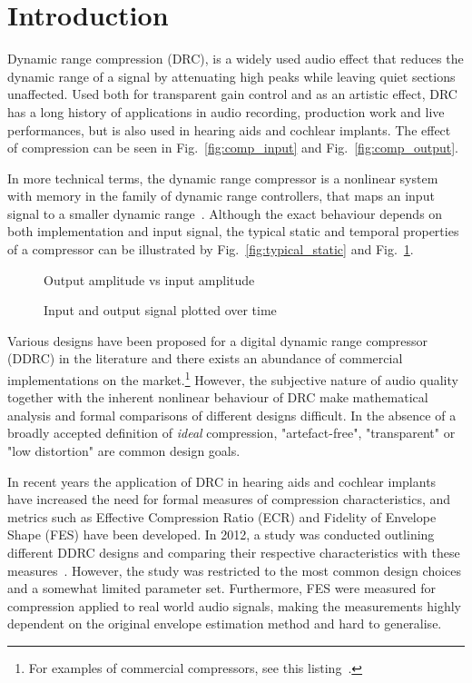 \documentclass[../main2.tex]{subfiles}
\providecommand{\rootdir}{..}
\begin{document}
\section{Introduction}
Dynamic range compression (DRC), is a widely used audio effect that reduces the dynamic range of a signal by attenuating high peaks while leaving quiet sections unaffected. Used both for transparent gain control and as an artistic effect, DRC has a long history of applications in audio recording, production work and live performances, but is also used in hearing aids and cochlear implants. The effect of compression can be seen in Fig.~\ref{fig:comp_input} and Fig.~\ref{fig:comp_output}.

In more technical terms, the dynamic range compressor is a nonlinear system with memory in the family of dynamic range controllers, that maps an input signal to a smaller dynamic range~\cite{dafx11}. Although the exact behaviour depends on both implementation and input signal, the typical static and temporal properties of a compressor can be illustrated by Fig.~\ref{fig:typical_static} and Fig.~\ref{fig:typical_envelope}.

\begin{figure}[ht]
\captionsetup{justification=centering}

\begin{minipage}[t]{.5\textwidth}
 \centering

\caption{Output amplitude vs input amplitude} 
\label{fig:typical_static}
\end{minipage}%
\begin{minipage}[t]{.5\textwidth}
\centering

\caption{Input and output signal plotted over time} 
\label{fig:typical_envelope}
\end{minipage}
\end{figure}

Various designs have been proposed for a digital dynamic range compressor (DDRC) in the literature and there exists an abundance of commercial implementations on the market.\footnote{For examples of commercial compressors, see this listing~\cite{commercial}.} However, the subjective nature of audio quality together with the inherent nonlinear behaviour of DRC make mathematical analysis and formal comparisons of different designs difficult. In the absence of a broadly accepted definition of \emph{ideal} compression, "artefact-free", "transparent" or "low distortion" are common design goals.

In recent years the application of DRC in hearing aids and cochlear implants have increased the need for formal measures of compression characteristics, and metrics such as Effective Compression Ratio (ECR) and Fidelity of Envelope Shape (FES) have been developed. In 2012, a study was conducted outlining different DDRC designs and comparing their respective characteristics with these measures~\cite{reiss2012tutorial}. However, the study was restricted to the most common design choices and a somewhat limited parameter set. Furthermore, FES were measured for compression applied to real world audio signals, making the measurements highly dependent on the original envelope estimation method and hard to generalise.
\end{document}
